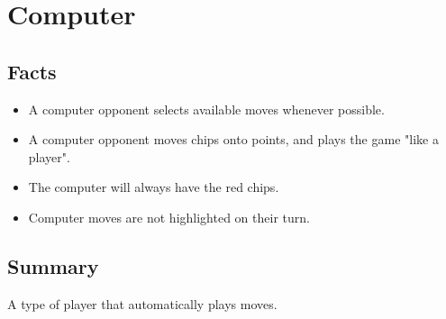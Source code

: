\section{Computer}

\subsection{Facts}

\begin{itemize} [itemsep=2pt,parsep=2pt]
    \item A computer opponent selects available moves whenever possible.
    \item A computer opponent moves chips onto points, and plays
    the game "like a player".
    \item The computer will always have the red chips.
    \item Computer moves are not highlighted on their turn.
\end{itemize}


\subsection{Summary}
A type of player that automatically plays moves.



